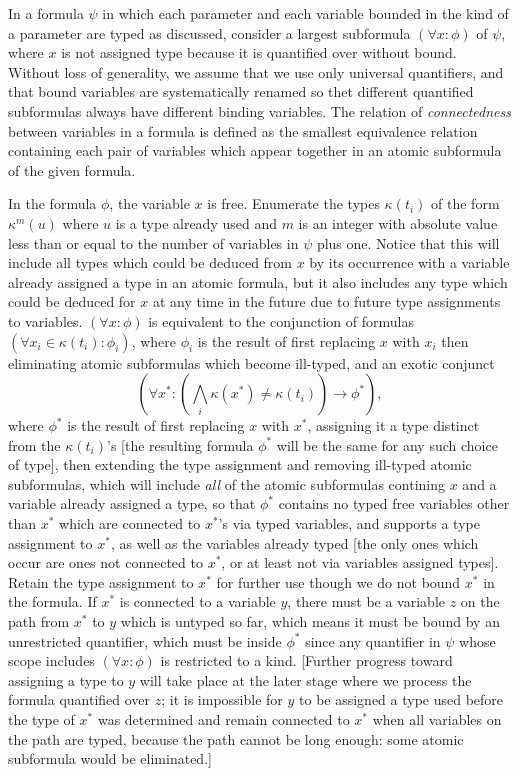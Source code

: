 \documentclass[12pt]{article}
\begin{document}
\begin{description}
In a formula $\psi$ in which each parameter and each variable bounded in the kind of a parameter are typed as discussed, consider
a largest subformula $(\forall x:\phi)$ of $\psi$, where $x$ is not assigned type because it is quantified over without bound.  Without loss of generality, we assume that we use only universal quantifiers, and that
bound variables are systematically renamed so thet different quantified subformulas always have different binding variables.  The relation of {\em connectedness\/} between variables in a formula is defined as the smallest equivalence relation containing each pair of variables which appear together in an  atomic subformula of the given formula.

In the formula $\phi$, the variable $x$ is free. 
Enumerate the types $\kappa(t_i)$ of the form $\kappa^m(u)$ where $u$ is a type already used and $m$ is an integer with absolute value less than or equal to the number of variables in $\psi$ plus one.  Notice that this will include all types which could be deduced from $x$ by its occurrence with a variable already assigned a type in an atomic formula, but it also includes any type which could be deduced for $x$ at any time in the future due to future type assignments to variables.  $(\forall x:\phi)$ is equivalent to the conjunction of formulas $(\forall x_i \in \kappa(t_i):\phi_i)$, where $\phi_i$ is the result of first replacing $x$ with $x_i$ then eliminating atomic subformulas
which become ill-typed, and an exotic conjunct $$(\forall x^*:(\bigwedge_i \kappa(x^*) \neq \kappa(t_i))\rightarrow \phi^*),$$ where $\phi^*$ is the result of first replacing $x$ with $x^*$, assigning it a type distinct from the $\kappa(t_i)$'s [the resulting formula $\phi^*$ will be the same for any such choice of type], then extending the type assignment and removing ill-typed atomic subformulas, which will include  {\em all\/} of the atomic subformulas contining $x$ and a variable already assigned a type, so that $\phi^*$ contains no typed free variables other than $x^*$ which are connected to $x^*$'s via typed variables, and supports a type assignment to $x^*$, as well as the variables already typed [the only ones which occur are ones not connected to $x^*$, or at least not via variables assigned types].  Retain the type assignment to $x^*$ for further use though we do not bound $x^*$ in the formula.  If $x^*$ is connected to a variable $y$, there must be a variable $z$ on the path from $x^*$ to $y$ which is untyped so far, which means it must be bound by an unrestricted quantifier, which must be inside $\phi^*$ since any quantifier in $\psi$ whose scope includes $(\forall x:\phi)$ is restricted to a kind.   [Further progress toward assigning a type to $y$ will take place at the later stage where we process the formula quantified over $z$; it is impossible for $y$ to be assigned a type used before the type of $x^*$ was determined and remain connected to $x^*$ when all variables on the path are typed, because the path cannot be long enough: some atomic subformula would be eliminated.]


\end{description}
\end{document}
